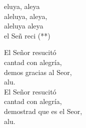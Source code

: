 \begin{cancion}%
	\begin{chorus}%
	eluya, aleya\\
	aleluya, aleya,\\
	aleluya aleya\\
	el Señ reci (**)  \\
	\end{chorus}%
El Señor resucitó\\
cantad con alegría,\\
	demos gracias al Seor,\\
	alu.\\
El Señor resucitó\\
cantad con alegría,\\
	demostrad que es el Seor,\\
	alu.\\
\end{cancion}%
